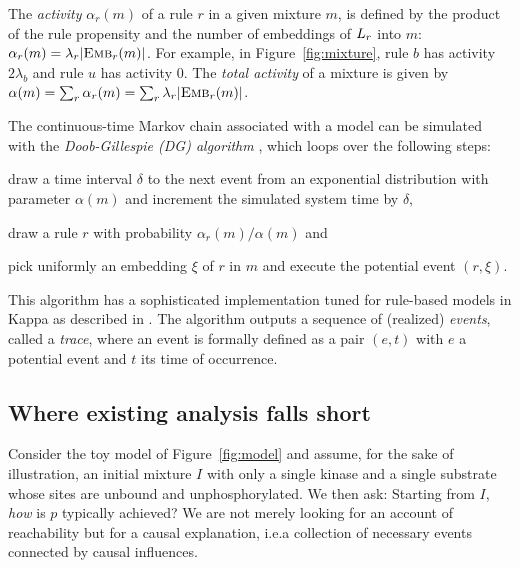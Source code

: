 The \emph{activity} $\alpha_r(m)$ of a rule $r$ in a given mixture $m$,
is defined by the product of the rule propensity and the number of
embeddings of $L_{r}$ into $m$:
$\alpha_r(m)=\lambda_r|{\textsc{Emb}}_{r}(m)|$. For example, in
Figure~\ref{fig:mixture}, rule $b$ has activity $2\lambda_b$ and rule
$u$ has activity $0$. The \emph{total activity} of a mixture is given
by $\alpha(m)=\sum_r\alpha_r(m)=\sum_r\lambda_r|{\textsc{Emb}}_{r}(m)|$.

The continuous-time Markov chain associated with a model can be
simulated with the \emph{Doob-Gillespie (DG) algorithm}
\cite{gillespie1977exact}, which loops over the
following steps:
\begin{inparaenum}[(1)]
\item draw a time interval $\delta$ to the next event from an
  exponential distribution with parameter $\alpha(m)$ and increment
  the simulated system time by $\delta$,
\item draw a rule $r$ with probability $\alpha_r(m)/\alpha(m)$ and
\item pick uniformly an embedding $\xi$ of $r$ in $m$ and execute the
  potential event $(r, \xi)$.
\end{inparaenum}
This algorithm has a sophisticated implementation tuned for rule-based
models in Kappa as described in
\cite{DanosEtAl-APLAS07,BoutillierEK17}. The algorithm outputs a sequence of (realized)
\emph{events}, called a \emph{trace}, where an event is formally
defined as a pair $(e, t)$ with $e$ a potential event and $t$ its time
of occurrence.



\subsection{Where existing analysis falls short}
\label{subsec:dumb-story}


Consider the toy model of Figure~\ref{fig:model} and assume, for the
sake of illustration, an initial mixture $I$ with only a single kinase
and a single substrate whose sites are unbound and
unphosphorylated. We then ask: Starting from $I$, \emph{how} is $p$
typically achieved? We are not merely looking for an account of
reachability but for a causal explanation, i.e.\@ a collection of
necessary events connected by causal influences.

